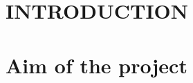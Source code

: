 \graphicspath{{images/}}

\section{INTRODUCTION}






\newpage
\section{Aim of the project} \label{chap: aim}
